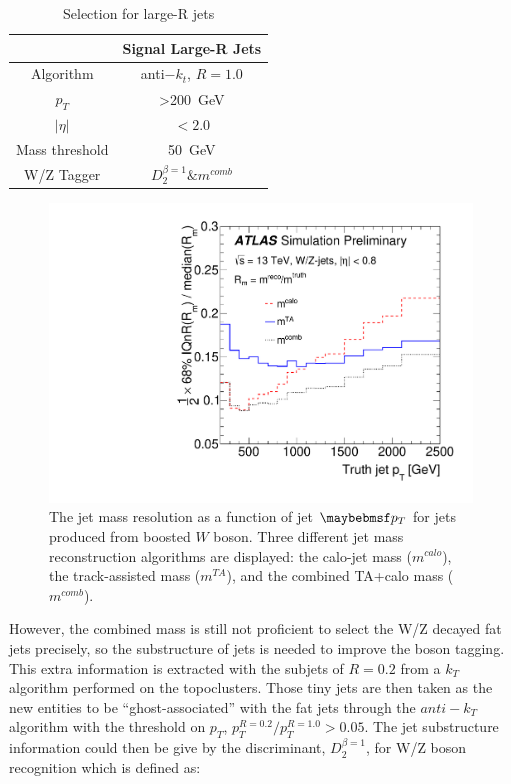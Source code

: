 \begin{table}[h]
	\caption{Selection for large-R jets}\label{Tab:Jdefinit}
	\vspace{2.0em}
	\centering
	\begin{tabular}{|c||c|}
		\hline
		& Signal Large-R Jets\\
		\hline
		Algorithm & anti$-k_t$, $R=1.0$\\
		$p_{T}$   & >200~GeV\\
		$| \eta |$      & $< 2.0 $\\
		Mass threshold  & 50~GeV\\
		W/Z Tagger &  $D^{\beta =1}_2 \& m^{comb}$ \\
		\hline
	\end{tabular}
\end{table}
\begin{figure}[ht]
	\begin{center}
		\includegraphics[width=0.6\hsize]{Chapter3/mass_resolution}
		\caption{The jet mass resolution as a function of jet $\p_{T}$ for jets produced from boosted $W$ boson\cite{ATLAS-CONF-2016-035}. Three different jet mass reconstruction algorithms are displayed: the calo-jet mass ($m^{{calo}}$), the track-assisted mass ($m^{{TA}}$), and the combined TA+calo mass ($m^{{comb}}$).}
		\label{Fig:combinedmassperformance}
	\end{center}
\end{figure}
\noindent
However, the combined mass is still not proficient to select the W/Z decayed fat jets precisely, so the substructure of jets is needed to improve the boson tagging. This extra information is extracted with the subjets of $R=0.2$ from a $k_{T}$ algorithm performed on the topoclusters. Those tiny jets are then taken as the new entities to be ``ghost-associated'' with the fat jets through the $anti-k_{T}$ algorithm with the threshold on $p_{T}$, $p_{T}^{R=0.2}/p_{T}^{R=1.0}>0.05$. The jet substructure information could then be give by the discriminant, $D^{\beta =1}_{2}$, for W/Z boson recognition which is defined as:
